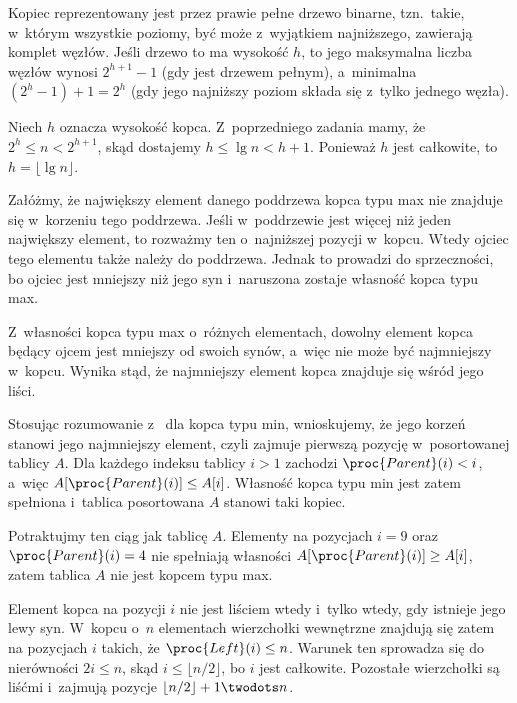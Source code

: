
\exercise %
Kopiec reprezentowany jest przez prawie pełne drzewo binarne, tzn.\ takie, w~którym wszystkie poziomy, być może z~wyjątkiem najniższego, zawierają komplet węzłów.
Jeśli drzewo to ma wysokość $h$, to jego maksymalna liczba węzłów wynosi $2^{h+1}-1$ (gdy jest drzewem pełnym), a~minimalna $(2^h-1)+1=2^h$ (gdy jego najniższy poziom składa się z~tylko jednego węzła).

\exercise %
Niech $h$ oznacza wysokość kopca.
Z~poprzedniego zadania mamy, że $2^h\le n<2^{h+1}$, skąd dostajemy $h\le\lg n<h+1$.
Ponieważ $h$ jest całkowite, to $h=\lfloor\lg n\rfloor$.

\exercise %
Załóżmy, że największy element danego poddrzewa kopca typu max nie znajduje się w~korzeniu tego poddrzewa.
Jeśli w~poddrzewie jest więcej niż jeden największy element, to rozważmy ten o~najniższej pozycji w~kopcu.
Wtedy ojciec tego elementu także należy do poddrzewa.
Jednak to prowadzi do sprzeczności, bo ojciec jest mniejszy niż jego syn i~naruszona zostaje własność kopca typu max.

\exercise %
Z~własności kopca typu max o~różnych elementach, dowolny element kopca będący ojcem jest mniejszy od swoich synów, a~więc nie może być najmniejszy w~kopcu.
Wynika stąd, że najmniejszy element kopca znajduje się wśród jego liści.

\exercise %
Stosując rozumowanie z~ dla kopca typu min, wnioskujemy, że jego korzeń stanowi jego najmniejszy element, czyli zajmuje pierwszą pozycję w~posortowanej tablicy $A$.
Dla każdego indeksu tablicy $i>1$ zachodzi $\proc{Parent}(i)<i$, a~więc $A[\proc{Parent}(i)]\le A[i]$.
Własność kopca typu min jest zatem spełniona i~tablica posortowana $A$ stanowi taki kopiec.

\exercise %
Potraktujmy ten ciąg jak tablicę $A$.
Elementy na pozycjach $i=9$ oraz $\proc{Parent}(i)=4$ nie spełniają własności $A[\proc{Parent}(i)]\ge A[i]$, zatem tablica $A$ nie jest kopcem typu max.

\exercise %
Element kopca na pozycji $i$ nie jest liściem wtedy i~tylko wtedy, gdy istnieje jego lewy syn.
W~kopcu o~$n$ elementach wierzchołki wewnętrzne znajdują się zatem na pozycjach $i$ takich, że $\proc{Left}(i)\le n$.
Warunek ten sprowadza się do nierówności $2i\le n$, skąd $i\le\lfloor n/2\rfloor$, bo $i$ jest całkowite.
Pozostałe wierzchołki są liśćmi i~zajmują pozycje $\lfloor n/2\rfloor+1\twodots n$.
